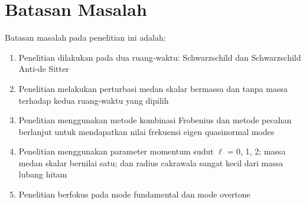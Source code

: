 \section{Batasan Masalah}

Batasan masalah pada penelitian ini adalah:
\begin{enumerate}
    \item Penelitian dilakukan pada dua ruang-waktu: Schwarzschild dan Schwarzschild 
    Anti-de Sitter

    \item Penelitian melakukan perturbasi medan skalar bermassa dan tanpa massa terhadap 
    kedua ruang-waktu yang dipilih

    \item Penelitian menggunakan metode kombinasi Frobenius dan metode pecahan berlanjut 
    untuk mendapatkan nilai frekuensi eigen quasinormal modes

    \item Penelitian menggunakan parameter momentum sudut $\ell$ = 0, 1, 2; massa medan skalar 
    bernilai satu; dan radius cakrawala sangat kecil dari massa lubang hitam

    \item Penelitian berfokus pada mode fundamental dan mode overtone
\end{enumerate}